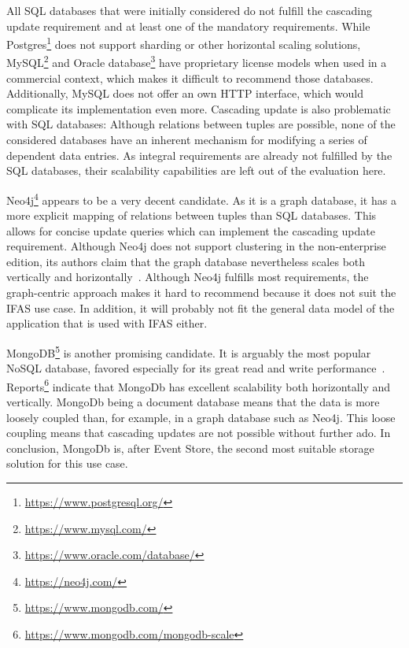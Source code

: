All \ac{SQL} databases that were initially considered do not fulfill the cascading update requirement and at least one of the mandatory requirements.
While Postgres\footnote{\url{https://www.postgresql.org/}} does not support sharding or other horizontal scaling solutions, MySQL\footnote{\url{https://www.mysql.com/}} and Oracle database\footnote{\url{https://www.oracle.com/database/}} have proprietary license models when used in a commercial context, which makes it difficult to recommend those databases.
Additionally, MySQL does not offer an own HTTP interface, which would complicate its implementation even more.
Cascading update is also problematic with \ac{SQL} databases: Although relations between tuples are possible, none of the considered databases have an inherent mechanism for modifying a series of dependent data entries.
As integral requirements are already not fulfilled by the \ac{SQL} databases, their scalability capabilities are left out of the evaluation here.

Neo4j\footnote{\url{https://neo4j.com/}} appears to be a very decent candidate.
As it is a graph database, it has a more explicit mapping of relations between tuples than \ac{SQL} databases.
This allows for concise update queries which can implement the cascading update requirement.
Although Neo4j does not support clustering in the non-enterprise edition, its authors claim that the graph database nevertheless scales both vertically and horizontally~\cite{Neo4jScalability}.
Although Neo4j fulfills most requirements, the graph-centric approach makes it hard to recommend because it does not suit the \ac{IFAS} use case.
In addition, it will probably not fit the general data model of the application that is used with \ac{IFAS} either.

MongoDB\footnote{\url{https://www.mongodb.com/}} is another promising candidate.
It is arguably the most popular NoSQL database, favored especially for its great read and write performance~\cite{6625441}.
Reports\footnote{\url{https://www.mongodb.com/mongodb-scale}} indicate that MongoDb has excellent scalability both horizontally and vertically.
MongoDb being a document database means that the data is more loosely coupled than, for example, in a graph database such as Neo4j.
This loose coupling means that cascading updates are not possible without further ado.
In conclusion, MongoDb is, after Event Store, the second most suitable storage solution for this use case.

